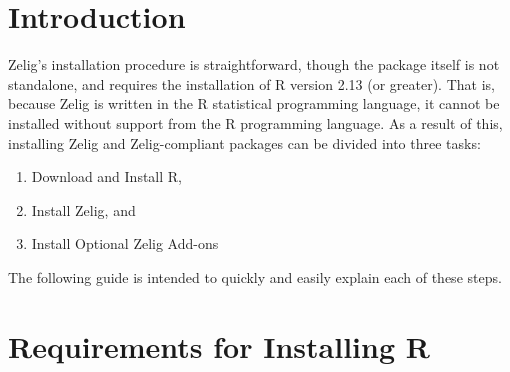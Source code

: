 \newcommand{\InstallInteractive}[0]{
  \href{http://r.iq.harvard.edu/install_live.R}{http://r.iq.harvard.edu/install_live.R}
}

\newcommand{\CranMirror}[0]{
  \href{http://cran.opensourceresources.org/}{http://cran.opensourceresources.org/}
}

\newcommand{\InstallInstructionsHref}[0]{
  \href{http://cran.r-project.org/doc/manuals/R-admin.html}{http://cran.r-project.org/doc/manuals/R-admin.html}
}


\newcommand{\MacInstallHref}[0]{
\href{http://cran.r-project.org/doc/manuals/R-admin.html\#Installing-R-under-_0028Mac_0029-OS-X}{Mac}
}

\newcommand{\WindowsInstallHref}[0]{
\href{http://cran.r-project.org/doc/manuals/R-admin.html\#Installing-R-under-Windows}{Windows}
}

\newcommand{\UnixInstallHref}[0]{
\href{http://cran.r-project.org/doc/manuals/R-admin.html\#Installing-R-under-Unix_002dalikes}{Unix-alike}
}


\section{Introduction}

Zelig's installation procedure is straightforward, though the package itself is
not standalone, and requires the installation of R version 2.13 (or greater).
That is, because Zelig is written in the R statistical programming language, it
cannot be installed without support from the R programming language. As a
result of this, installing Zelig and Zelig-compliant packages can be divided
into three tasks:

\begin{enumerate}
  \item Download and Install R,
  \item Install Zelig, and
  \item Install Optional Zelig Add-ons
\end{enumerate}

The following guide is intended to quickly and easily explain each of these steps.


%
%
\section{Requirements for Installing R}

